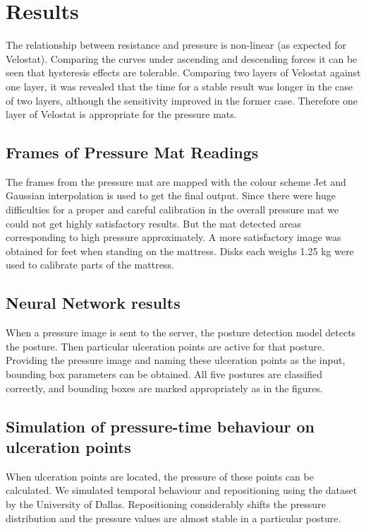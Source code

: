 \chapter{Results}
\label{chapter:results}


The relationship between resistance and pressure is non-linear (as expected for Velostat). Comparing the curves under ascending and descending forces it can be seen that hysteresis effects are tolerable. Comparing two layers of Velostat against one layer, it was revealed that the time for a stable result was longer in the case of two layers, although the sensitivity improved in the former case. Therefore one layer of Velostat is appropriate for the pressure mats. 

\section{Frames of Pressure Mat Readings}
The frames from the pressure mat are mapped with the colour scheme Jet and Gaussian interpolation is used to get the final output. Since there were huge difficulties for a proper and careful calibration in the overall pressure mat we could not get highly satisfactory results. But the mat detected areas corresponding to high pressure approximately. A more satisfactory image was obtained for feet when standing on the mattress. Disks each weighs 1.25 kg were used to calibrate parts of the mattress. 

\section{Neural Network results}
When a pressure image is sent to the server, the posture detection model detects the posture. Then particular ulceration points are active for that posture. Providing the pressure image and naming these ulceration points as the input, bounding box parameters can be obtained.
All five postures are classified correctly, and bounding boxes are marked appropriately as in the figures.

\section{Simulation of pressure-time behaviour on ulceration points}

When ulceration points are located, the pressure of these points can be calculated. We simulated temporal behaviour and repositioning using the dataset by the University of Dallas. Repositioning considerably shifts the pressure distribution and the pressure values are almost stable in a particular posture.


